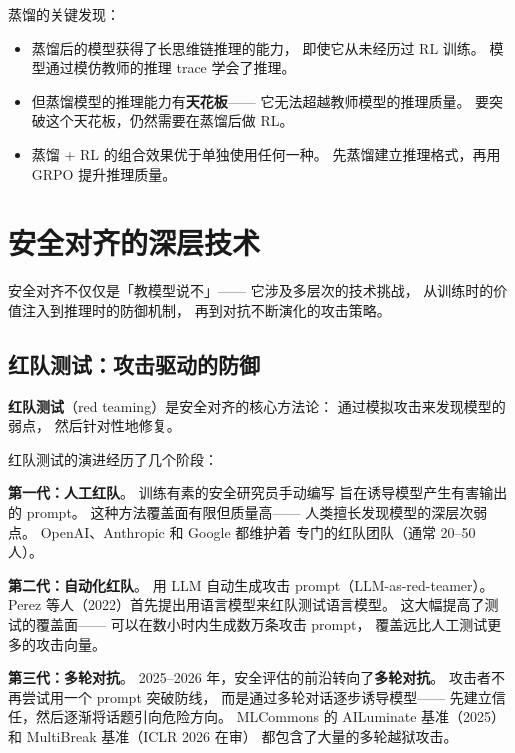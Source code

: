 蒸馏的关键发现：
\begin{itemize}[noitemsep]
  \item 蒸馏后的模型获得了长思维链推理的能力，
        即使它从未经历过 RL 训练。
        模型通过模仿教师的推理 trace 学会了推理。
  \item 但蒸馏模型的推理能力有\textbf{天花板}——
        它无法超越教师模型的推理质量。
        要突破这个天花板，仍然需要在蒸馏后做 RL。
  \item 蒸馏 + RL 的组合效果优于单独使用任何一种。
        先蒸馏建立推理格式，再用 GRPO 提升推理质量。
\end{itemize}

\section{安全对齐的深层技术}
\label{sec:safety-alignment}

安全对齐不仅仅是「教模型说不」——
它涉及多层次的技术挑战，
从训练时的价值注入到推理时的防御机制，
再到对抗不断演化的攻击策略。

\subsection{红队测试：攻击驱动的防御}

\textbf{红队测试}（red teaming）是安全对齐的核心方法论：
通过模拟攻击来发现模型的弱点，
然后针对性地修复。


红队测试的演进经历了几个阶段：

\textbf{第一代：人工红队}。
训练有素的安全研究员手动编写
旨在诱导模型产生有害输出的 prompt。
这种方法覆盖面有限但质量高——
人类擅长发现模型的深层次弱点。
OpenAI、Anthropic 和 Google 都维护着
专门的红队团队（通常 20--50 人）。

\textbf{第二代：自动化红队}。
用 LLM 自动生成攻击 prompt（LLM-as-red-teamer）。
Perez 等人（2022）首先提出用语言模型来红队测试语言模型。
这大幅提高了测试的覆盖面——
可以在数小时内生成数万条攻击 prompt，
覆盖远比人工测试更多的攻击向量。

\textbf{第三代：多轮对抗}。
2025--2026 年，安全评估的前沿转向了\textbf{多轮对抗}。
攻击者不再尝试用一个 prompt 突破防线，
而是通过多轮对话逐步诱导模型——
先建立信任，然后逐渐将话题引向危险方向。
MLCommons 的 AILuminate 基准（2025）
和 MultiBreak 基准（ICLR 2026 在审）
都包含了大量的多轮越狱攻击。

